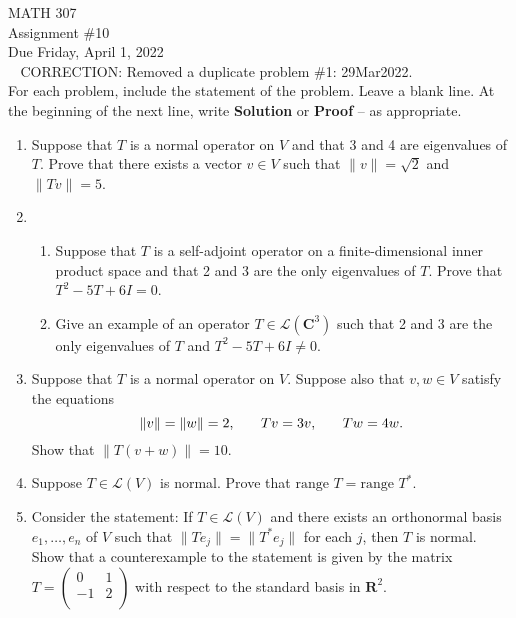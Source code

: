 \documentclass[12pt]{article}
\begin{document}
\noindent MATH 307 \\
Assignment \#10 \\  %
Due Friday, April 1, 2022 \\$\;\;$ CORRECTION: Removed a duplicate problem \#1: 29Mar2022.\\


For each problem, include the statement of the problem. Leave a blank line.  At the beginning of the next line, write \textbf{Solution} or \textbf{Proof} -- as appropriate.

\begin{enumerate}
\item Suppose that $T$ is a normal operator on $V$ and that 3 and 4 are eigenvalues of $T$.  Prove that there exists a vector $v \in V$ such that $\|v\| = \sqrt{2}$ and $\|Tv\| = 5$.

\item \begin{enumerate}
        \item Suppose that $T$ is a self-adjoint operator on a finite-dimensional inner product space and that 2 and 3 are the only eigenvalues of $T$.  Prove that $T^2-5T+6I=0$.
        \item Give an example of an operator $T \in \mathcal{L}(\mathbf{C}^3)$ such that 2 and 3 are the only eigenvalues of $T$ and $T^2-5T+6I \ne 0$.
        \end{enumerate}

\item  Suppose that $T$ is a normal operator on $V$.  Suppose also that $v, w \in V$ satisfy the equations
    \[
        \|v\| = \|w\| = 2, \hspace{.25in} Tv=3v, \hspace{.25in} Tw=4w.
    \]
    Show that $\|T(v+w)\| = 10$.

\item Suppose $T \in \mathcal{L}(V)$ is normal.  Prove that $\text{range }T = \text{range }T^*$.

\item
  Consider the statement: If $T \in \mathcal{L}(V)$ and there exists an orthonormal basis $e_1, \ldots , e_n$ of $V$ such that $\|Te_j\| = \|T^*e_j\|$ for each $j$, then $T$ is normal.  Show that a counterexample to the statement is given by the matrix
    $T = \left(
  \begin{array}{cc}
    0 & 1  \\
    -1 & 2  \\
  \end{array}
\right)$ with respect to the standard basis in $\mathbf{R}^2$.


\end{enumerate}
\end{document}
